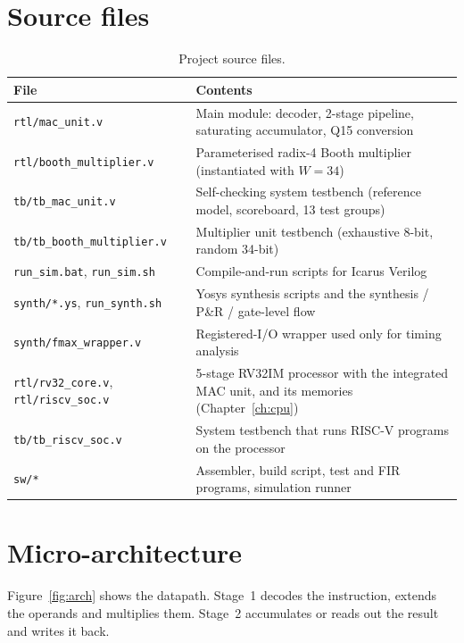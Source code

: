 \documentclass[11pt,a4paper]{report}
\newcommand{\code}[1]{\texttt{#1}}
\begin{document}
\section{Source files}
\begin{table}[H]
  \centering
  \caption{Project source files.}
  \label{tab:files}
  \small
  \begin{tabularx}{\linewidth}{@{}lX@{}}
    \toprule
    File & Contents \\
    \midrule
    \code{rtl/mac\_unit.v} & Main module: decoder, 2-stage pipeline, saturating accumulator, Q15 conversion \\
    \code{rtl/booth\_multiplier.v} & Parameterised radix-4 Booth multiplier (instantiated with $W=34$) \\
    \code{tb/tb\_mac\_unit.v} & Self-checking system testbench (reference model, scoreboard, 13 test groups) \\
    \code{tb/tb\_booth\_multiplier.v} & Multiplier unit testbench (exhaustive 8-bit, random 34-bit) \\
    \code{run\_sim.bat}, \code{run\_sim.sh} & Compile-and-run scripts for Icarus Verilog \\
    \code{synth/*.ys}, \code{run\_synth.sh} & Yosys synthesis scripts and the synthesis / P\&R / gate-level flow \\
    \code{synth/fmax\_wrapper.v} & Registered-I/O wrapper used only for timing analysis \\
    \code{rtl/rv32\_core.v}, \code{rtl/riscv\_soc.v} & 5-stage RV32IM processor with the integrated MAC unit, and its memories (Chapter~\ref{ch:cpu}) \\
    \code{tb/tb\_riscv\_soc.v} & System testbench that runs RISC-V programs on the processor \\
    \code{sw/*} & Assembler, build script, test and FIR programs, simulation runner \\
    \bottomrule
  \end{tabularx}
\end{table}

\section{Micro-architecture}
Figure~\ref{fig:arch} shows the datapath. Stage~1 decodes the instruction,
extends the operands and multiplies them. Stage~2 accumulates or reads out
the result and writes it back.
\end{document}
